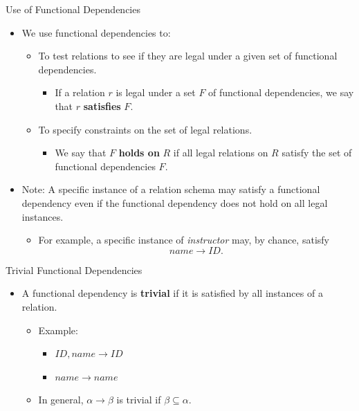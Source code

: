 \documentclass[aspectratio=169]{beamer}
\begin{document}
\begin{frame}{Use of Functional Dependencies}
    \begin{itemize}
        \item We use functional dependencies to:
        \begin{itemize}
            \item To test relations to see if they are legal under a given set of functional dependencies.
            \begin{itemize}
                \item If a relation $r$ is legal under a set $F$ of functional dependencies, we say that $r$ \textbf{satisfies} $F$.
            \end{itemize}
            \item To specify constraints on the set of legal relations.
            \begin{itemize}
                \item We say that $F$ \textbf{holds on} $R$ if all legal relations on $R$ satisfy the set of functional dependencies $F$.
            \end{itemize}
        \end{itemize}
        \item Note: A specific instance of a relation schema may satisfy a functional dependency even if the functional dependency does not hold on all legal instances.
        \begin{itemize}
            \item For example, a specific instance of \textit{instructor} may, by chance, satisfy
            $$
                name \rightarrow ID.
            $$
        \end{itemize}
    \end{itemize}
\end{frame}

\begin{frame}{Trivial Functional Dependencies}
    \begin{itemize}
        \item A functional dependency is \textbf{trivial} if it is satisfied by all instances of a relation.
        \begin{itemize}
            \item Example:
            \begin{itemize}
                \item $ID, name \rightarrow ID$
                \item $name \rightarrow name$
            \end{itemize}
            \item In general, $\alpha \rightarrow \beta$ is trivial if $\beta \subseteq \alpha$.
        \end{itemize}
    \end{itemize}
\end{frame}
\end{document}
